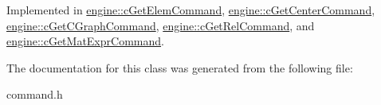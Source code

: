 Implemented in \hyperlink{classengine_1_1cGetElemCommand_ad84c73fe5b4db65679f28c427d201434}{engine\-::c\-Get\-Elem\-Command}, \hyperlink{classengine_1_1cGetCenterCommand_ab00fa221228c2550e8f664c6d887e1e0}{engine\-::c\-Get\-Center\-Command}, \hyperlink{classengine_1_1cGetCGraphCommand_a0a3d07c4f82227b7f0ffbcf01f7fcec2}{engine\-::c\-Get\-C\-Graph\-Command}, \hyperlink{classengine_1_1cGetRelCommand_ad6aa9cb526ae1b73237edaad02d081ec}{engine\-::c\-Get\-Rel\-Command}, and \hyperlink{classengine_1_1cGetMatExprCommand_a6a9c787618267539be3004983c3d1747}{engine\-::c\-Get\-Mat\-Expr\-Command}.



The documentation for this class was generated from the following file\-:\begin{DoxyCompactItemize}
\item 
command.\-h\end{DoxyCompactItemize}
